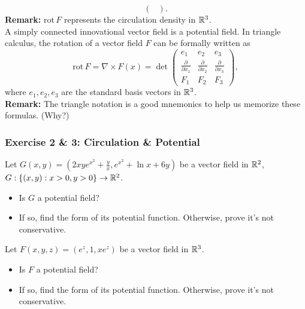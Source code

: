 \documentclass[11pt, t]{beamer}
\newcommand{\nullspace}{~\\[15pt]}
\newcommand{\Remark}{\textbf{Remark: }}
\begin{document}
\begin{frame}[allowframebreaks]
\[\begin{pmatrix}
        \end{pmatrix}.\]
    \Remark $\text{rot}\,F$ represents the circulation density in $\mathbb{R}^3$.\nullspace
    A simply connected innovational vector field is a potential field.
    \newpage
    In triangle calculus, the rotation of a vector field $F$ can be formally written as
    \[\text{rot}\,F=\nabla\times F(x)
        =\det\begin{pmatrix}
            e_1                           & e_2                           & e_3                           \\[3pt]
            \frac{\partial}{\partial x_1} & \frac{\partial}{\partial x_2} & \frac{\partial}{\partial x_3} \\[3pt]
            F_1                           & F_2                           & F_3
        \end{pmatrix},\]
    where $e_1,e_2,e_3$ are the standard basis vectors in $\mathbb{R}^3$.
    \nullspace
    \Remark The triangle notation is a good mnemonics to help us memorize these formulas. (Why?)
\end{frame}

\begin{frame}
    \frametitle{Exercise 2 \& 3: Circulation \& Potential}
    Let $G(x, y)=\left(2 x y e^{x^{2}}+\frac{y}{x}, e^{x^{2}}+\ln x+6 y\right)$ be a vector field in $\mathbb{R}^2$, $G:\{(x,y):x>0,y>0\}\to\mathbb{R}^2$.
    \begin{itemize}
        \item Is $G$ a potential field?
        \item If so, find the form of its potential function. Otherwise, prove it's not conservative.
    \end{itemize}
    \vspace{1cm}
    Let $F(x,y,z)=(e^z,1,xe^z)$ be a vector field in $\mathbb{R}^3$.
    \begin{itemize}
        \item Is $F$ a potential field?
        \item If so, find the form of its potential function. Otherwise, prove it's not conservative.
    \end{itemize}

\end{frame}
\end{document}
